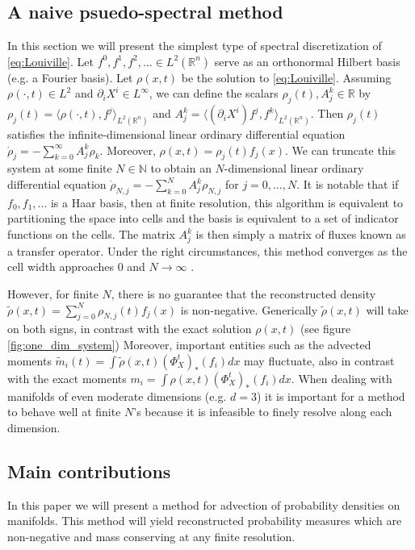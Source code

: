 \documentclass[letterpaper, 10 pt, conference]{ieeeconf}
\newcommand{\R}{\mathbb{R}}
\begin{document}
\subsection{A naive psuedo-spectral method}
\label{sec:naive}
  In this section we will present the simplest type of
  spectral discretization of \eqref{eq:Louiville}.
  Let $f^0,f^1,f^2,\dots \in L^2(\R^n)$ serve as an
  orthonormal Hilbert basis (e.g. a Fourier basis).
  Let $\rho(x,t)$ be the solution to \eqref{eq:Louiville}.
  Assuming $\rho(\cdot,t) \in L^2$ and $\partial_i X^i \in L^{\infty}$,
  we can define the scalars $\rho_j(t), A^k_j \in \R$
  by $\rho_j(t) = \langle \rho(\cdot ,t) , f^j \rangle_{L^2(\R^n)}$
  and $A^k_j = \langle (\partial_i X^i) f^j , f^k \rangle_{L^2(\R^n)}$.
  Then $\rho_j(t)$ satisfies the infinite-dimensional linear
  ordinary differential equation
  $
    \dot{\rho}_j = - \sum_{k=0}^{\infty}A^k_j \rho_k
  $.
  Moreover, $\rho(x,t) = \rho_j(t) f_j(x)$.
  We can truncate this system at some finite $N \in \mathbb{N}$
  to obtain an $N$-dimensional linear ordinary differential equation
  $\dot{\rho}_{N,j} = -\sum_{k=0}^{N} A^k_j \rho_{N,j}$ for $j=0,\dots,N$.
  It is notable that if $f_0,f_1,\dots$ is a Haar basis, then
  at finite resolution, this algorithm is equivalent to 
  partitioning the space into cells and the basis is equivalent
  to a set of indicator functions on the cells.
  The matrix $A^k_j$ is then simply a matrix of fluxes 
  known as a transfer operator.
  Under the right circumstances,
  this method converges as the cell width approaches $0$ and $N \to \infty$
  \cite{FroylandJungeKoltai2013}.

  However, for finite $N$, there is no guarantee that the reconstructed
  density $\tilde{\rho}(x,t) = \sum_{j=0}^N \rho_{N,j}(t) f_j(x)$
  is non-negative.
  Generically $\tilde{\rho}(x,t)$ will take on both signs, in
  contrast with the exact solution $\rho(x,t)$ (see figure \ref{fig:one_dim_system})
  Moreover, important entities such as the advected moments
  $\tilde{m}_i(t) = \int \tilde{\rho}(x,t) (\Phi_X^t)_*(f_i)dx$
  may fluctuate, also in contrast with the exact moments
  $m_i = \int \rho(x,t)  (\Phi_X^t)_*(f_i) dx$.
  When dealing with manifolds of even moderate dimensions
  (e.g. $d=3$) it is important for a method to behave well at finite $N$'s
  because it is infeasible to finely resolve along each dimension.

\subsection{Main contributions}
  In this paper we will present a method for advection of
  probability densities on manifolds.
  This method will yield reconstructed probability measures
  which are non-negative and mass conserving at any finite resolution.
\end{document}
